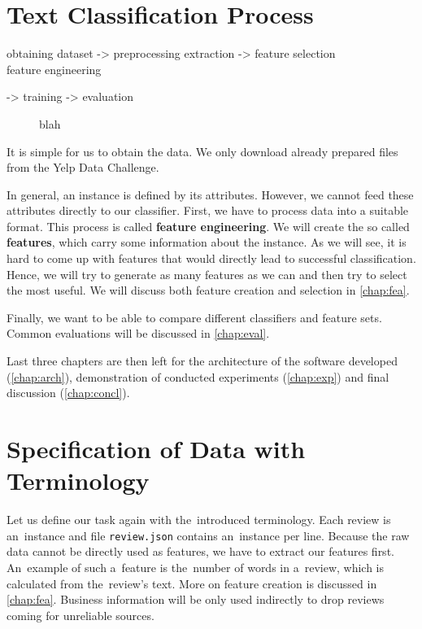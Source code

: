 \section{Text Classification Process}

\begin{code}
obtaining dataset
-> preprocessing {extraction} -> feature selection
 ^^^^^^^^^^^^^^^^^^^^^^^^^^^^^^^^^^^^^^^^^^^^^^^^^^^^^^
    		feature engineering

-> training -> evaluation
\end{code}
\begin{figure}
	blah
	\label{fig:cls_process}
\end{figure}

It is simple for us to obtain the data. We only download already prepared files from the Yelp Data Challenge.

In general, an instance is defined by its attributes.
However, we cannot feed these attributes directly to our classifier.
First, we have to process data into a suitable format. This process is called {\bf feature engineering}.
We will create the so called {\bf features}, which carry some information about the instance.
As we will see, it is hard to come up with features that would directly lead to successful classification.
Hence, we will try to generate as many features as we can and then try to select the most useful.
We will discuss both feature creation and selection in \autoref{chap:fea}.


Finally, we want to be able to compare different classifiers and feature sets. Common evaluations will be discussed in \autoref{chap:eval}.

Last three chapters are then left for the architecture of the software developed (\autoref{chap:arch}), demonstration of conducted experiments (\autoref{chap:exp}) and final discussion (\autoref{chap:concl}).


\section{Specification of Data with Terminology}

Let us define our task again with the~introduced terminology.
Each review is an~instance and file \texttt{review.json} contains an~instance per line.
Because the raw data cannot be directly used as features, we have to extract our features first.
An~example of such a~feature is the~number of words in a~review, which is calculated from the~review's text.
More on feature creation is discussed in \autoref{chap:fea}.
Business information will be only used indirectly to drop reviews coming for unreliable sources.


